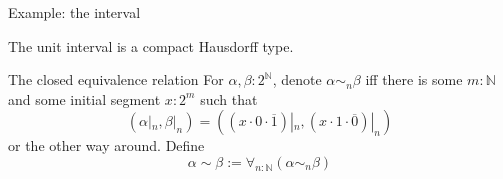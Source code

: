 \begin{frame}{Example: the interval}
  \begin{lemma}
    The unit interval is a compact Hausdorff type. 
  \end{lemma}
  \begin{block}{The closed equivalence relation}
  For $\alpha,\beta:2^\mathbb N$, 
  \pause denote 
      $\alpha \sim_n \beta$ iff 
      \pause 
      there is some $m:\mathbb N$ and some 
      initial segment $x:2^m$ such that 
      \pause
      \vspace{-0.2cm}
      $$
      (\alpha|_n,\beta|_n)= 
      ( 
        (x \cdot 0 \cdot \overline 1)|_n , 
        (x \cdot 1 \cdot \overline 0)|_n
        ) 
      $$
      \vspace{-0.4cm}
      or the other way around. 
      \pause 
      Define 
      $$\alpha\sim\beta := \forall_{n:\mathbb N} (\alpha \sim_n \beta)$$
    \end{block}
\end{frame}

